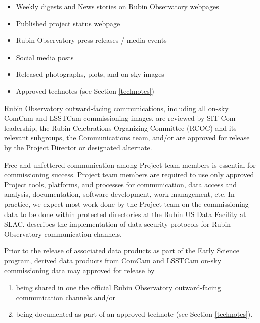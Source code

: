 \documentclass[SE,authoryear,toc]{lsstdoc}
\begin{document}
\begin{itemize}

  \item Weekly digests and News stories on \href{https://rubinobservatory.org/}{Rubin Observatory webpages}

  \item \href{https://www.lsst.org/about/project-status}{Published project status webpage}

  \item Rubin Observatory press releases / media events

  \item Social media posts

  \item Released photographs, plots, and on-sky images

  \item Approved technotes (see Section \ref{technotes})

\end{itemize}

Rubin Observatory outward-facing communications, including all on-sky ComCam and LSSTCam commissioning images, are reviewed by SIT-Com leadership, the Rubin Celebrations Organizing Committee (RCOC) and its relevant subgroups, the Communications team, and/or are approved for release by the Project Director or designated alternate.

Free and unfettered communication among Project team members is essential for commissioning success.
Project team members are required to use only approved Project tools, platforms, and processes for communication, data access and analysis, documentation, software development, work management, etc.
In practice, we expect most work done by the Project team on the commissioning data to be done within protected directories at the Rubin US Data Facility at SLAC.
 describes the implementation of data security protocols for Rubin Observatory communication channels.

Prior to the release of associated data products as part of the Early Science program, derived data products from ComCam and LSSTCam on-sky commissioning data may approved for release by

\begin{enumerate}

  \item being shared in one the official Rubin Observatory outward-facing communication channels and/or

  \item being documented as part of an approved technote (see Section \ref{technotes}).

\end{enumerate}
\end{document}
